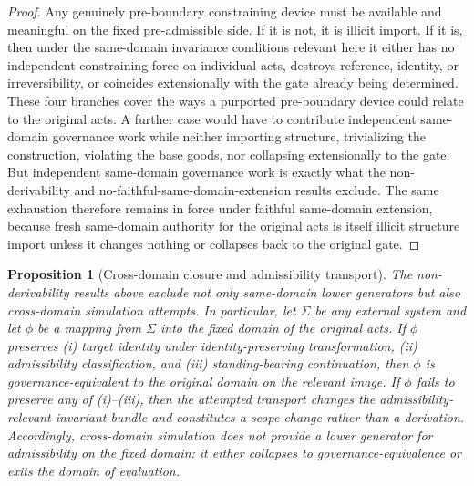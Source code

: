 \documentclass[11pt]{article}
\newtheorem{proposition}[theorem]{Proposition}
\theoremstyle{definition}
\theoremstyle{remark}
\begin{document}
\begin{proof}
Any genuinely pre-boundary constraining device must be available and meaningful on the fixed pre-admissible side. If it is not, it is illicit import. If it is, then under the same-domain invariance conditions relevant here it either has no independent constraining force on individual acts, destroys reference, identity, or irreversibility, or coincides extensionally with the gate already being determined. These four branches cover the ways a purported pre-boundary device could relate to the original acts. A further case would have to contribute independent same-domain governance work while neither importing structure, trivializing the construction, violating the base goods, nor collapsing extensionally to the gate. But independent same-domain governance work is exactly what the non-derivability and no-faithful-same-domain-extension results exclude. The same exhaustion therefore remains in force under faithful same-domain extension, because fresh same-domain authority for the original acts is itself illicit structure import unless it changes nothing or collapses back to the original gate.
\end{proof}

\begin{proposition}[Cross-domain closure and admissibility transport]\label{prop:cross-domain-closure}
The non-derivability results above exclude not only same-domain lower generators but also cross-domain simulation attempts. In particular, let $\Sigma$ be any external system and let $\phi$ be a mapping from $\Sigma$ into the fixed domain of the original acts. If $\phi$ preserves (i) target identity under identity-preserving transformation, (ii) admissibility classification, and (iii) standing-bearing continuation, then $\phi$ is governance-equivalent to the original domain on the relevant image. If $\phi$ fails to preserve any of (i)--(iii), then the attempted transport changes the admissibility-relevant invariant bundle and constitutes a scope change rather than a derivation. Accordingly, cross-domain simulation does not provide a lower generator for admissibility on the fixed domain: it either collapses to governance-equivalence or exits the domain of evaluation.
\end{proposition}
\end{document}
